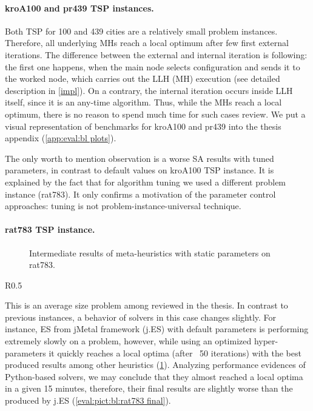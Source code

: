 \paragraph{kroA100 and pr439 TSP instances.}

Both TSP for 100 and 439 cities are a relatively small problem instances. Therefore, all underlying MHs reach a local optimum after few first external iterations. The difference between the external and internal iteration is following: the first one happens, when the main node selects configuration and sends it to the worked node, which carries out the LLH (MH) execution (see detailed description in \cref{impl}). On a contrary, the internal iteration occurs inside LLH itself, since it is an any-time algorithm. Thus, while the MHs reach a local optimum, there is no reason to spend much time for such cases review. We put a visual representation of benchmarks for kroA100 and pr439 into the thesis appendix (\cref{app:eval:bl plots}).

The only worth to mention observation is a worse SA results with tuned parameters, in contrast to default values on kroA100 TSP instance. It is explained by the fact that for algorithm tuning we used a different problem instance (rat783). It only confirms a motivation of the parameter control approaches: tuning is not problem-instance-universal technique.

\paragraph{rat783 TSP instance.}
\begin{figure}[b]
	\centering
	\vspace{-20pt}
	
	\caption{Intermediate results of meta-heuristics with static parameters on rat783.}
	\vspace{-5pt}
	\label{eval:pict:bl:rat783 intermediate}
\end{figure}

\setlength{\columnsep}{5pt}%
\setlength{\intextsep}{5pt}%
\begin{wrapfigure}{R}{0.5\textwidth}%
	\centering
	
	\label{eval:pict:bl:rat783 final}
	\caption{Final results of meta-heuristics with static parameters on rat783.}
	\vspace{-10pt}
\end{wrapfigure}
This is an average size problem among reviewed in the thesis. In contrast to previous instances, a behavior of solvers in this case changes slightly. For instance, ES from jMetal framework (j.ES) with default parameters is performing extremely slowly on a problem, however, while using an optimized hyper-parameters it quickly reaches a local optima (after ~50 iterations) with the best produced results among other heuristics (\cref{eval:pict:bl:rat783 intermediate}). Analyzing performance evidences of Python-based solvers, we may conclude that they almost reached a local optima in a given 15 minutes, therefore, their final results are slightly worse than the produced by j.ES (\cref{eval:pict:bl:rat783 final}).


